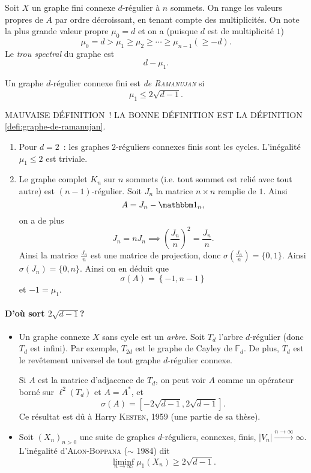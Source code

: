 Soit $X$ un graphe fini connexe $d$-régulier à $n$ sommets. On range les valeurs propres de $A$ par ordre
décroissant, en tenant compte des multiplicités. On note la plus grande valeur propre $\mu_0 = d$ et on a
(puisque $d$ est de multiplicité $1$) 
\[ \mu_0 = d > \mu_1 \geq \mu_2 \geq \cdots \geq \mu_{n-1} (\geq -d). \]
Le \emph{trou spectral} du graphe est 
\[ d - \mu_1. \]

\begin{defi}
  Un graphe $d$-régulier connexe fini est \emph{de \textsc{Ramanujan}} si 
  \[ \mu_1 \leq 2 \sqrt{d - 1}. \]
\end{defi}

MAUVAISE DÉFINITION~! LA BONNE DÉFINITION EST LA DÉFINITION \ref{defi:graphe-de-ramanujan}.


\begin{exs}
  \begin{enumerate}
  \item Pour $d = 2$~: les graphes $2$-réguliers connexes finis sont les cycles. L'inégalité $\mu_1 \leq 2$
    est triviale.
  \item Le graphe complet $K_n$ sur $n$ sommets (i.e. tout sommet est relié avec tout
    autre) est $(n-1)$-régulier. Soit $J_n$ la matrice $n \times n$ remplie de $1$. Ainsi 
    \[ A = J_n - \un_n, \]
    on a de plus 
    \[ J_n = n J_n \implies \left(\frac{J_n}{n}\right)^2 = \frac{J_n}{n}. \]
    Ainsi la matrice $\frac{J_n}{n}$ est une matrice de projection, donc $\sigma\left( \frac{J_n}{n} \right) =
    \{0,1\}$. Ainsi $\sigma(J_n) = \{0,n\}$. Ainsi on en déduit que 
    \[ \sigma(A) = \left\{-1, n-1\right\} \]
    et $-1 = \mu_1$.
  \end{enumerate}
\end{exs}

\paragraph{D'où sort $2\sqrt{d-1}$?}

\begin{itemize}
\item Un graphe connexe $X$ sans cycle est un \emph{arbre}. Soit $T_d$ l'arbre $d$-régulier (donc
  $T_d$ est infini). Par exemple, $T_{2d}$ est le graphe de Cayley de $\mathbb{F}_d$. De plus, $T_d$ est le
  revêtement universel de tout graphe $d$-régulier connexe.

  Si $A$ est la matrice d'adjacence de $T_d$, on peut voir $A$ comme un opérateur borné sur $\ell^2(T_d)$ et
  $A = A^\ast$, et
  \[ \sigma(A) = \left[ -2 \sqrt{d-1}, 2 \sqrt{d-1} \right]. \] Ce résultat est dû à Harry \textsc{Kesten},
  1959 (une partie de sa thèse).

  
\item Soit $(X_n)_{n > 0}$ une suite de graphes $d$-réguliers, connexes, finis, $|V_n| \xrightarrow{n \to
    \infty} \infty$. L'inégalité d'\textsc{Alon-Boppana} ($\sim$ 1984) dit 
  \[ \liminf_{n \to \infty} \mu_1(X_n) \geq 2 \sqrt{d-1}. \]
\end{itemize}

